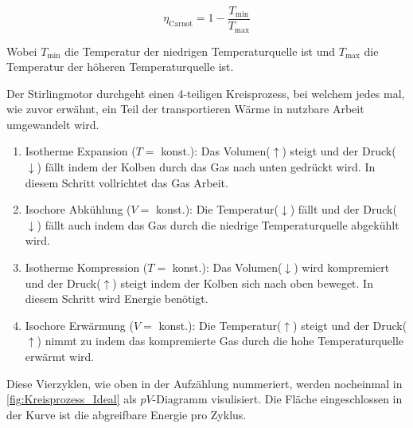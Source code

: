 \documentclass[11pt]{scrartcl}
\begin{document}
\begin{equation}
    \eta_{\text{Carnot}} = 1 - \frac{T_{\text{min}}}{T_{\text{max}}} \label{eq:carnot}
\end{equation}

Wobei $T_{\text{min}}$ die Temperatur der niedrigen Temperaturquelle ist und $T_{\text{max}}$
die Temperatur der höheren Temperaturquelle ist.

Der Stirlingmotor durchgeht einen 4-teiligen Kreisprozess, bei welchem 
jedes mal, wie zuvor erwähnt, ein Teil der transportieren Wärme in 
nutzbare Arbeit umgewandelt wird. 
\begin{enumerate}
    \item Isotherme Expansion ($T=$ konst.): Das Volumen($\uparrow$) steigt 
        und der Druck($\downarrow$) fällt indem 
        der Kolben durch das Gas nach unten gedrückt wird. In diesem Schritt
        vollrichtet das Gas Arbeit.
    \item Isochore Abkühlung ($V=$ konst.): Die Temperatur($\downarrow$) 
        fällt und der Druck($\downarrow$) fällt auch indem das Gas durch die 
        niedrige Temperaturquelle abgekühlt wird.
    \item Isotherme Kompression ($T=$ konst.): Das Volumen($\downarrow$) wird kompremiert
        und der Druck($\uparrow$) steigt indem der Kolben sich nach oben beweget. In 
        diesem Schritt wird Energie benötigt.
    \item Isochore Erwärmung ($V=$ konst.): Die Temperatur($\uparrow$)
        steigt und der Druck($\uparrow$) nimmt zu indem das kompremierte Gas 
        durch die hohe Temperaturquelle erwärmt wird.
\end{enumerate}

Diese Vierzyklen, wie oben in der Aufzählung nummeriert, werden nocheinmal
in \autoref{fig:Kreisprozess_Ideal} als $pV$-Diagramm visulisiert. Die 
Fläche eingeschlossen in der Kurve ist die abgreifbare Energie pro Zyklus.
\end{document}
